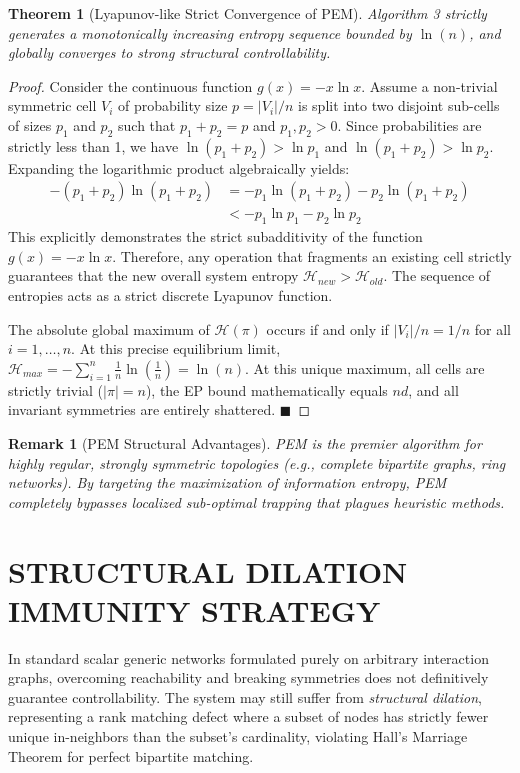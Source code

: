 \documentclass{IEEEtran}
\newtheorem{theorem}{Theorem}
\newtheorem{remark}{Remark}
\begin{document}
	\begin{theorem}[Lyapunov-like Strict Convergence of PEM]
		Algorithm 3 strictly generates a monotonically increasing entropy sequence bounded by $\ln(n)$, and globally converges to strong structural controllability.
	\end{theorem}
	\begin{proof}
		Consider the continuous function $g(x) = -x \ln x$. Assume a non-trivial symmetric cell $V_i$ of probability size $p = |V_i|/n$ is split into two disjoint sub-cells of sizes $p_1$ and $p_2$ such that $p_1 + p_2 = p$ and $p_1, p_2 > 0$. Since probabilities are strictly less than 1, we have $\ln(p_1 + p_2) > \ln p_1$ and $\ln(p_1 + p_2) > \ln p_2$. Expanding the logarithmic product algebraically yields:
		\begin{align}
			- (p_1 + p_2) \ln(p_1 + p_2) &= -p_1\ln(p_1+p_2) - p_2\ln(p_1+p_2) \nonumber \\
			&< - p_1 \ln p_1 - p_2 \ln p_2
		\end{align}
		This explicitly demonstrates the strict subadditivity of the function $g(x) = -x \ln x$. Therefore, any operation that fragments an existing cell strictly guarantees that the new overall system entropy $\mathcal{H}_{new} > \mathcal{H}_{old}$. The sequence of entropies acts as a strict discrete Lyapunov function. 
		
		The absolute global maximum of $\mathcal{H}(\pi)$ occurs if and only if $|V_i|/n = 1/n$ for all $i = 1, \dots, n$. At this precise equilibrium limit, $\mathcal{H}_{max} = - \sum_{i=1}^n \frac{1}{n} \ln\left(\frac{1}{n}\right) = \ln(n)$. At this unique maximum, all cells are strictly trivial ($|\pi|=n$), the EP bound mathematically equals $nd$, and all invariant symmetries are entirely shattered. \hfill $\blacksquare$
	\end{proof}
	
	\begin{remark}[PEM Structural Advantages]
		PEM is the premier algorithm for highly regular, strongly symmetric topologies (e.g., complete bipartite graphs, ring networks). By targeting the maximization of information entropy, PEM completely bypasses localized sub-optimal trapping that plagues heuristic methods.
	\end{remark}
	
	\section{STRUCTURAL DILATION IMMUNITY STRATEGY}
	In standard scalar generic networks formulated purely on arbitrary interaction graphs, overcoming reachability and breaking symmetries does not definitively guarantee controllability. The system may still suffer from \textit{structural dilation}, representing a rank matching defect where a subset of nodes has strictly fewer unique in-neighbors than the subset's cardinality, violating Hall's Marriage Theorem for perfect bipartite matching.
	
\end{document}
